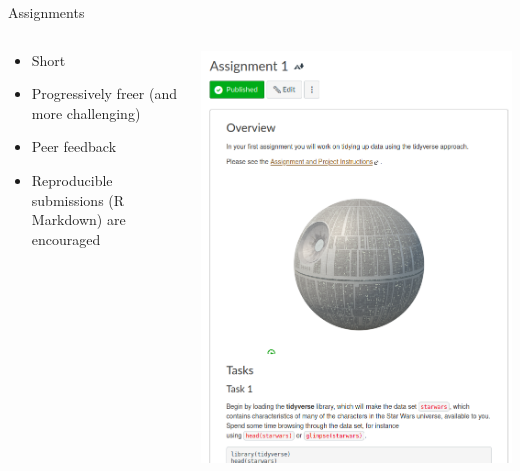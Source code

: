 \begin{frame}{Assignments}
  \begin{columns}[c,onlytextwidth]
    \begin{column}{0.5\linewidth}
      \begin{itemize}
        \item Short
        \item Progressively freer (and more challenging)
        \item Peer feedback
        \item Reproducible submissions (R Markdown) are encouraged
      \end{itemize}
    \end{column}
    \begin{column}{0.5\linewidth}
      \includegraphics[width=\linewidth]{figures/assignment.png}
    \end{column}
  \end{columns}
\end{frame}

